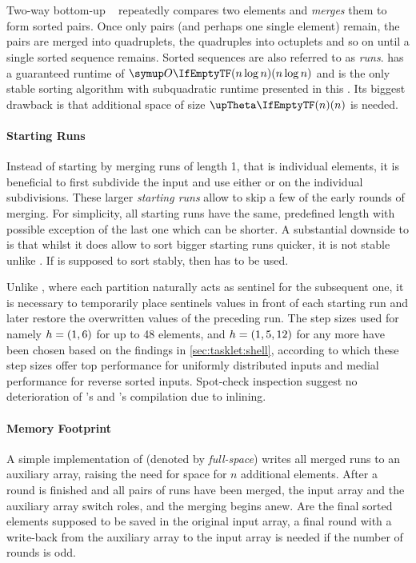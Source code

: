 \section{\texorpdfstring{\MS{}}{MergeSort}}
\label{sec:tasklet:merge}

Two-way bottom-up \MS{}~\cites{katajainen1997meticulous}[85\psq]{maurer1974datenstrukturen}[Chapter~2.3.1]{wirth1975algorithmen} repeatedly compares two elements and \emph{merges} them to form sorted pairs.
Once only pairs (and perhaps one single element) remain, the pairs are merged into quadruplets, the quadruples into octuplets and so on until a single sorted sequence remains.
Sorted sequences are also referred to as \emph{runs}.
\MS{} has a guaranteed runtime of \(\bigoh{n \log n}\) and is the only stable sorting algorithm with subquadratic runtime presented in this .
Its biggest drawback is that additional space of size \(\bigtheta{n}\) is needed.


\paragraph{Starting Runs}
Instead of starting by merging runs of length 1, that is individual elements, it is beneficial to first subdivide the input and use either \IS{} or \ShS{} on the individual subdivisions.
These larger \emph{starting runs} allow to skip a few of the early rounds of merging.
For simplicity, all starting runs have the same, predefined length with possible exception of the last one which can be shorter.
A substantial downside to \ShS{} is that whilst it does allow to sort bigger starting runs quicker, it is not stable unlike \IS{}.
If \MS{} is supposed to sort stably, then \IS{} has to be used.

Unlike \QS{}, where each partition naturally acts as sentinel for the subsequent one, it is necessary to temporarily place sentinels values in front of each starting run and later restore the overwritten values of the preceding run.
The step sizes used for \ShS{} \Dash namely \(h = (1, 6)\) for up to 48 elements, and \(h = (1, 5, 12)\) for any more \Dash have been chosen based on the findings in \cref{sec:tasklet:shell}, according to which these step sizes offer top performance for uniformly distributed inputs and medial performance for reverse sorted inputs.
Spot-check inspection suggest no deterioration of \IS{}'s and \ShS{}'s compilation due to inlining.


\paragraph{Memory Footprint}
A simple implementation of \MS{} (denoted by \emph{full-space}) writes all merged runs to an auxiliary array, raising the need for space for \(n\) additional elements.
After a round is finished and all pairs of runs have been merged, the input array and the auxiliary array switch roles, and the merging begins anew.
Are the final sorted elements supposed to be saved in the original input array, a final round with a write-back from the auxiliary array to the input array is needed if the number of rounds is odd.

